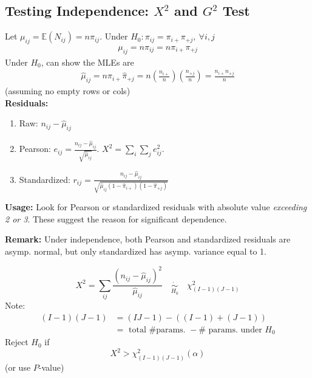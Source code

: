 \documentclass[11pt]{elegantbook}
\begin{document}
\subsection{Testing Independence: $X^2$ and $G^2$ Test}
Let $\mu_{ij}=\mathbb{E}(N_{ij})=n\pi_{ij}$. Under $H_0:\pi_{ij}=\pi_{i+}\pi_{+j},\ \forall i,j$
\begin{equation}
    \begin{aligned}
        \mu_{ij}=n\pi_{ij}=n\pi_{i+}\pi_{+j}
    \end{aligned}
    \nonumber
\end{equation}
Under $H_0$, can show the MLEs are
\begin{equation}
    \begin{aligned}
        \hat{\mu}_{ij}=n\hat{\pi}_{i+}\hat{\pi}_{+j}=n\left(\frac{n_{i+}}{n}\right)\left(\frac{n_{+j}}{n}\right)=\frac{n_{i+}n_{+j}}{n}
    \end{aligned}
    \nonumber
\end{equation}
(assuming no empty rows or cols)\\
\textbf{Residuals:}
\begin{enumerate}
    \item Raw: $n_{ij}-\hat{\mu}_{ij}$
    \item Pearson: $e_{ij}=\frac{n_{ij}-\hat{\mu}_{ij}}{\sqrt{\hat{\mu}_{ij}}}$. $X^2=\sum_i\sum_j e_{ij}^2$.
    \item Standardized: $r_{ij}=\frac{n_{ij}-\hat{\mu}_{ij}}{\sqrt{\hat{\mu}_{ij}(1-\hat{\pi}_{i+})(1-\hat{\pi}_{+j})}}$
\end{enumerate}
\textbf{Usage:} Look for Pearson or standardized residuals with absolute value \textit{exceeding 2 or 3}. These suggest the reason for significant dependence.

\textbf{Remark:} Under independence, both Pearson and standardized residuals are asymp. normal, but only standardized has asymp. variance equal to 1.

\begin{definition}
    $$X^2=\sum_{i j} \frac{\left(n_{i j}-\hat{\mu}_{i j}\right)^2}{\hat{\mu}_{i j}} \quad \underset{H_0}{\dot{\sim}}\quad \chi_{(I-1)(J-1)}^2$$
    Note:
    $$
    \begin{aligned}
    (I-1)(J-1) & =(I J-1)-((I-1)+(J-1)) \\
    & =\text { total \# params. }-\# \text { params. under } H_0
    \end{aligned}
    $$
    Reject $H_0$ if
    $$
    X^2>\chi_{(I-1)(J-1)}^2(\alpha)
    $$
    (or use $P$-value)
\end{definition}
\end{document}
